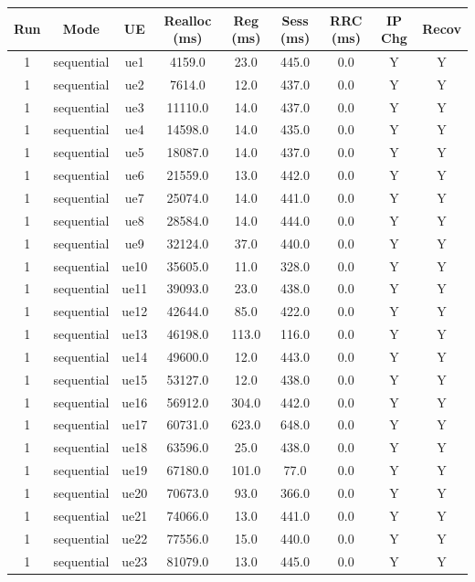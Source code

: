 \begin{table}[ht]
\centering
\begin{tabular}{|c|c|c|c|c|c|c|c|c|}
\hline
Run & Mode & UE & Realloc (ms) & Reg (ms) & Sess (ms) & RRC (ms) & IP Chg & Recov \\
\hline
1 & sequential & ue1 & 4159.0 & 23.0 & 445.0 & 0.0 & Y & Y \\
1 & sequential & ue2 & 7614.0 & 12.0 & 437.0 & 0.0 & Y & Y \\
1 & sequential & ue3 & 11110.0 & 14.0 & 437.0 & 0.0 & Y & Y \\
1 & sequential & ue4 & 14598.0 & 14.0 & 435.0 & 0.0 & Y & Y \\
1 & sequential & ue5 & 18087.0 & 14.0 & 437.0 & 0.0 & Y & Y \\
1 & sequential & ue6 & 21559.0 & 13.0 & 442.0 & 0.0 & Y & Y \\
1 & sequential & ue7 & 25074.0 & 14.0 & 441.0 & 0.0 & Y & Y \\
1 & sequential & ue8 & 28584.0 & 14.0 & 444.0 & 0.0 & Y & Y \\
1 & sequential & ue9 & 32124.0 & 37.0 & 440.0 & 0.0 & Y & Y \\
1 & sequential & ue10 & 35605.0 & 11.0 & 328.0 & 0.0 & Y & Y \\
1 & sequential & ue11 & 39093.0 & 23.0 & 438.0 & 0.0 & Y & Y \\
1 & sequential & ue12 & 42644.0 & 85.0 & 422.0 & 0.0 & Y & Y \\
1 & sequential & ue13 & 46198.0 & 113.0 & 116.0 & 0.0 & Y & Y \\
1 & sequential & ue14 & 49600.0 & 12.0 & 443.0 & 0.0 & Y & Y \\
1 & sequential & ue15 & 53127.0 & 12.0 & 438.0 & 0.0 & Y & Y \\
1 & sequential & ue16 & 56912.0 & 304.0 & 442.0 & 0.0 & Y & Y \\
1 & sequential & ue17 & 60731.0 & 623.0 & 648.0 & 0.0 & Y & Y \\
1 & sequential & ue18 & 63596.0 & 25.0 & 438.0 & 0.0 & Y & Y \\
1 & sequential & ue19 & 67180.0 & 101.0 & 77.0 & 0.0 & Y & Y \\
1 & sequential & ue20 & 70673.0 & 93.0 & 366.0 & 0.0 & Y & Y \\
1 & sequential & ue21 & 74066.0 & 13.0 & 441.0 & 0.0 & Y & Y \\
1 & sequential & ue22 & 77556.0 & 15.0 & 440.0 & 0.0 & Y & Y \\
1 & sequential & ue23 & 81079.0 & 13.0 & 445.0 & 0.0 & Y & Y \\

\end{tabular}
\end{table}
